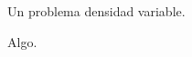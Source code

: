 \setcounter{figure}{0}

\begin{Exercise}
  Un problema densidad variable.
\end{Exercise}
\begin{Answer}
  Algo.
\end{Answer}
%
